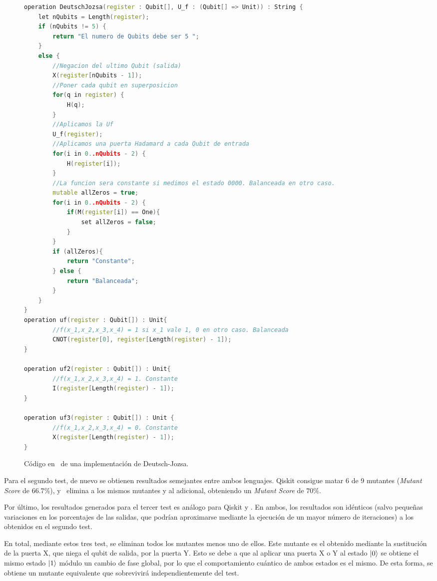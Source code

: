 \begin{figure}[H]
\begin{lstlisting}[language=c++]
operation DeutschJozsa(register : Qubit[], U_f : (Qubit[] => Unit)) : String {
	let nQubits = Length(register);
    if (nQubits != 5) {
   		return "El numero de Qubits debe ser 5 ";
    }
    else {
    	//Negacion del ultimo Qubit (salida)
        X(register[nQubits - 1]); 
        //Poner cada qubit en superposicion
        for(q in register) {
        	H(q);
        }         
        //Aplicamos la Uf
        U_f(register);
        //Aplicamos una puerta Hadamard a cada Qubit de entrada
        for(i in 0..nQubits - 2) {
        	H(register[i]);
        }        
        //La funcion sera constante si medimos el estado 0000. Balanceada en otro caso.
        mutable allZeros = true;
        for(i in 0..nQubits - 2) {
           	if(M(register[i]) == One){
            	set allZeros = false;
            }
        } 
        if (allZeros){
        	return "Constante";
        } else {
        	return "Balanceada";
        }
	}
}
operation uf(register : Qubit[]) : Unit{
		//f(x_1,x_2,x_3,x_4) = 1 si x_1 vale 1, 0 en otro caso. Balanceada
		CNOT(register[0], register[Length(register) - 1]);
}

operation uf2(register : Qubit[]) : Unit{
		//f(x_1,x_2,x_3,x_4) = 1. Constante
		I(register[Length(register) - 1]);
}

operation uf3(register : Qubit[]) : Unit { 
		//f(x_1,x_2,x_3,x_4) = 0. Constante  
		X(register[Length(register) - 1]);
}
\end{lstlisting}
\caption{Código en \qsh\ de una implementación de Deutsch-Jozsa.}
\label{fig:code63}
\end{figure}

Para el segundo test, de nuevo se obtienen resultados semejantes entre ambos lenguajes. Qiskit consigue matar 6 de 9 mutantes (\textit{Mutant Score} de $66.7\%$), y \qsh\ elimina a los mismos mutantes y al adicional, obteniendo un \textit{Mutant Score} de $70\%$. 

Por último, los resultados generados para el tercer test es análogo para Qiskit y \qsh. En ambos, los resultados son idénticos (salvo pequeñas variaciones en los porcentajes de las salidas, que podrían aproximarse mediante la ejecución de un mayor número de iteraciones) a los obtenidos en el segundo test.

En total, mediante estos tres test, se eliminan todos los mutantes menos uno de ellos. Este mutante es el obtenido mediante la sustitución de la puerta X, que niega el qubit de salida, por la puerta Y. Esto se debe a que al aplicar una puerta X o Y al estado $\left|0\right\rangle$ se obtiene el mismo estado $\left|1\right\rangle$ módulo un cambio de fase global, por lo que el comportamiento cuántico de ambos estados es el mismo. De esta forma, se obtiene un mutante equivalente que sobrevivirá independientemente del test. 

